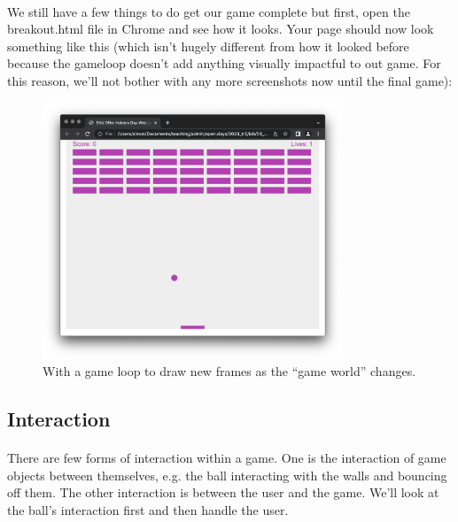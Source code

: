 \documentclass[10pt, a4paper, oneside]{article}
\begin{document}
\paragraph{} We still have a few things to do get our game complete but first, open the breakout.html file in Chrome and see how it looks. Your page should now look something like this (which isn't hugely different from how it looked before because the gameloop doesn't add anything visually impactful to out game. For this reason, we'll not bother with any more screenshots now until the final game):

\begin{figure}[H]
\centering
\includegraphics[width=0.8\textwidth]{images/03_gameloop+gameloop.png}
\caption{With a game loop to draw new frames as the ``game world'' changes.}
\label{fig:03_gameloop+gameloop}
\end{figure}


\subsection{Interaction}

\paragraph{} There are few forms of interaction within a game. One is the interaction of game objects between themselves, e.g. the ball interacting with the walls and bouncing off them. The other interaction is between the user and the game. We'll look at the ball's interaction first and then handle the user.
\end{document}
